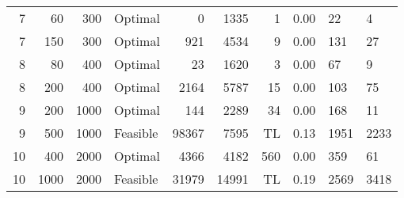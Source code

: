 \documentclass[11pt]{article}
\begin{document}
\begin{tabular}{rrrlrrrrll}
    7 &    60 &        300 &   Optimal &          0 &      1335 &             1 &         0.00 &     22 &      4 \\
    7 &   150 &        300 &   Optimal &        921 &      4534 &             9 &         0.00 &    131 &     27 \\
    8 &    80 &        400 &   Optimal &         23 &      1620 &             3 &         0.00 &     67 &      9 \\
    8 &   200 &        400 &   Optimal &       2164 &      5787 &            15 &         0.00 &    103 &     75 \\
    9 &   200 &       1000 &   Optimal &        144 &      2289 &            34 &         0.00 &    168 &     11 \\
    9 &   500 &       1000 &  Feasible &      98367 &      7595 &          TL &         0.13 &   1951 &   2233 \\
   10 &   400 &       2000 &   Optimal &       4366 &      4182 &           560 &         0.00 &    359 &     61 \\
   10 &  1000 &       2000 &  Feasible &      31979 &     14991 &          TL &         0.19 &   2569 &   3418 \\
\bottomrule
\end{tabular}
\end{document}
